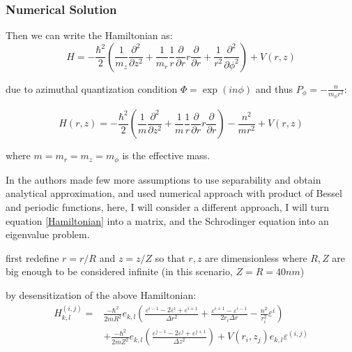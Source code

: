 \documentclass[twoside,11pt]{article}
\begin{document}
        \subsubsection{Numerical Solution}
        Then we can write the Hamiltonian as:
        \begin{equation}
            H = -\frac{\hbar^2}{2}\left( \frac{1}{m_z} \frac{\partial^2}{\partial z^2} + \frac{1}{m_r} \frac{1}{r} \frac{\partial}{\partial r} r \frac{\partial}{\partial r} + \frac{1}{r^2} \frac{\partial^2}{\partial \phi^2}\right) + V(r, z) 
        \end{equation}
        
        due to azimuthal quantization condition $\Phi = \exp(in\phi)$ and thus $P_{\phi} = -\frac{n}{m_\phi r^2}$:
        
        \begin{equation}
            H(r, z) = -\frac{\hbar^2}{2}\left( \frac{1}{m}\frac{\partial^2}{\partial z^2} + \frac{1}{m}\frac{1}{r}\frac{\partial}{\partial r} r \frac{\partial}{\partial r}\right) - \frac{n^2}{m r^2} + V(r, z) 
            \label{Hamiltonian}
        \end{equation}
        
        where $m = m_r = m_z = m_{\phi}$ is the effective mass.
        
        In \cite{marzin1994calculation} the authors made few more assumptions to use separability and obtain analytical approximation, and used numerical approach with product of Bessel and periodic functions, here, I will consider a different approach, I will turn equation \ref{Hamiltonian} into a matrix, and the Schrodinger equation into an eigenvalue problem.
        
        first redefine $r = r/R$ and $z = z/Z$ so that $r, z$ are dimensionless where $R, Z$ are big enough to be considered infinite (in this scenario, $Z = R = 40nm$)
        
        by desensitization of the above Hamiltonian:
        \begin{equation}
            \begin{split}
            H^{(i, j)}_{k, l} = & \frac{-\hbar^2}{2mR^2}e_{k, l}\left(\frac{\varepsilon^{i-1} -2\varepsilon^{i} + \varepsilon^{i+1}}{\Delta r^2} + \frac{\varepsilon^{i+1}-\varepsilon^{i-1}}{2r_i\Delta r} - \frac{n^2}{r_i^2}\varepsilon^{i}\right) \\
            & + \frac{-\hbar^2}{2mZ^2}e_{k, l}\left(\frac{\varepsilon^{j-1} -2\varepsilon^{j} + \varepsilon^{j+1}}{\Delta z^2}\right) + V(r_i, z_j)e_{k, l}\varepsilon^{(i, j)}
            \end{split}
        \end{equation}
        
\end{document}
